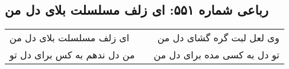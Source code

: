\begin{center}
\section*{رباعی شماره ۵۵۱: ای زلف مسلسلت بلای دل من}
\label{sec:sh551}
\begin{longtable}{l p{0.5cm} r}
ای زلف مسلسلت بلای دل من
&&
وی لعل لبت گره گشای دل من
\\
من دل ندهم به کس برای دل تو
&&
تو دل به کسی مده برای دل من
\\
\end{longtable}
\end{center}
